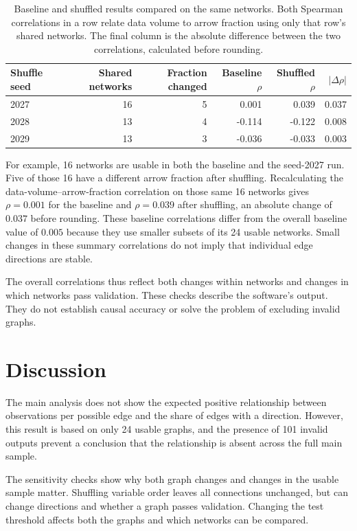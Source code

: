 \documentclass[11pt,a4paper]{article}
\begin{document}
\begin{table}[!htbp]
\centering
\small
\caption{Baseline and shuffled results compared on the same networks. Both Spearman correlations in a row relate data volume to arrow fraction using only that row's shared networks. The final column is the absolute difference between the two correlations, calculated before rounding.}
\label{tab:shared-shuffles}
\begin{tabular}{@{}lrrrrr@{}}
\toprule
Shuffle seed & Shared networks & Fraction changed & Baseline $\rho$ & Shuffled $\rho$ & $|\Delta\rho|$\\
\midrule
2027 & 16 & 5 & 0.001 & 0.039 & 0.037\\
2028 & 13 & 4 & -0.114 & -0.122 & 0.008\\
2029 & 13 & 3 & -0.036 & -0.033 & 0.003\\
\bottomrule
\end{tabular}
\end{table}

For example, 16 networks are usable in both the baseline and the seed-2027 run. Five of those 16 have a different arrow fraction after shuffling. Recalculating the data-volume--arrow-fraction correlation on those same 16 networks gives $\rho=0.001$ for the baseline and $\rho=0.039$ after shuffling, an absolute change of $0.037$ before rounding. These baseline correlations differ from the overall baseline value of $0.005$ because they use smaller subsets of its 24 usable networks. Small changes in these summary correlations do not imply that individual edge directions are stable.
\FloatBarrier

The overall correlations thus reflect both changes within networks and changes in which networks pass validation. These checks describe the software's output. They do not establish causal accuracy or solve the problem of excluding invalid graphs.

\FloatBarrier
\section{Discussion}
The main analysis does not show the expected positive relationship between observations per possible edge and the share of edges with a direction. However, this result is based on only 24 usable graphs, and the presence of 101 invalid outputs prevent a conclusion that the relationship is absent across the full main sample.

The sensitivity checks show why both graph changes and changes in the usable sample matter. Shuffling variable order leaves all connections unchanged, but can change directions and whether a graph passes validation. Changing the test threshold affects both the graphs and which networks can be compared.
\end{document}
